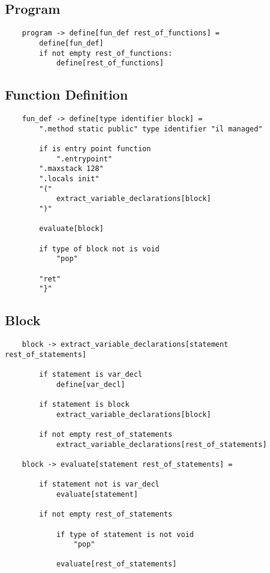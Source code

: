 \documentclass{report}
\begin{document}
\subsection{Program}

\begin{verbatim}
    program -> define[fun_def rest_of_functions] =
        define[fun_def]
        if not empty rest_of_functions:
            define[rest_of_functions]
\end{verbatim}

\subsection{Function Definition}

\begin{verbatim}
    fun_def -> define[type identifier block] =
        ".method static public" type identifier "il managed"

        if is entry point function
            ".entrypoint"
        ".maxstack 128"
        ".locals init"
        "("
            extract_variable_declarations[block]
        ")"

        evaluate[block]

        if type of block not is void
            "pop"

        "ret"
        "}"
\end{verbatim}

\subsection{Block}

\begin{verbatim}
    block -> extract_variable_declarations[statement rest_of_statements]

        if statement is var_decl
            define[var_decl]

        if statement is block
            extract_variable_declarations[block]

        if not empty rest_of_statements
            extract_variable_declarations[rest_of_statements]

    block -> evaluate[statement rest_of_statements] =

        if statement not is var_decl
            evaluate[statement]

        if not empty rest_of_statements

            if type of statement is not void
                "pop"

            evaluate[rest_of_statements]
\end{verbatim}
\end{document}
